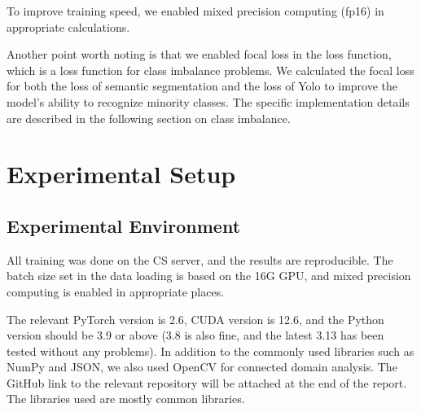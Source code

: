 \documentclass[conference]{IEEEtran}
\begin{document}
To improve training speed, we enabled mixed precision computing (fp16) in appropriate calculations.


Another point worth noting is that we enabled focal loss in the loss function, which is a loss function for class imbalance problems. We calculated the focal loss for both the loss of semantic segmentation and the loss of Yolo to improve the model's ability to recognize minority classes. The specific implementation details are described in the following section on class imbalance.

\section{Experimental Setup}
\subsection{Experimental Environment}



All training was done on the CS server, and the results are reproducible. The batch size set in the data loading is based on the 16G GPU, and mixed precision computing is enabled in appropriate places.

The relevant PyTorch version is 2.6, CUDA version is 12.6, and the Python version should be 3.9 or above (3.8 is also fine, and the latest 3.13 has been tested without any problems). In addition to the commonly used libraries such as NumPy and JSON, we also used OpenCV for connected domain analysis. The GitHub link to the relevant repository will be attached at the end of the report. The libraries used are mostly common libraries.
\end{document}
